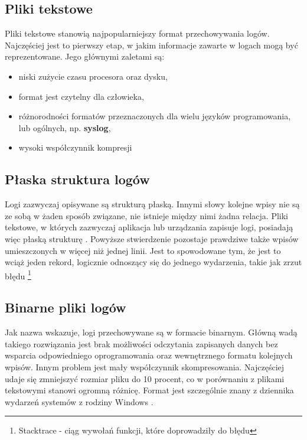     \subsection{Pliki tekstowe}
    Pliki tekstowe stanowią najpopularniejszy format przechowywania logów. Najczęściej jest to 
    pierwszy etap, w jakim informacje zawarte w logach mogą być reprezentowane. Jego głównymi zaletami są:
    \begin{itemize}
        \item niski zużycie czasu procesora oraz dysku,
        \item format jest czytelny dla człowieka,
        \item różnorodności formatów przeznaczonych dla wielu języków programowania,
        lub ogólnych, np. \textbf{syslog},
        \item wysoki współczynnik kompresji \cite{logging_log_management}
    \end{itemize}
    
    \subsection{Płaska struktura logów}
    Logi zazwyczaj opisywane są strukturą płaską. Innymi słowy kolejne wpisy nie są ze sobą w żaden sposób
    związane, nie istnieje między nimi żadna relacja. Pliki tekstowe, w których zazwyczaj aplikacja lub
    urządzania zapisuje logi, posiadają więc płaską strukturę \cite{logging_log_management}. Powyższe stwierdzenie
    pozostaje prawdziwe także wpisów umieszczonych w więcej niż jednej linii. Jest to spowodowane tym, że
    jest to wciąż jeden rekord, logicznie odnoszący się do jednego wydarzenia, takie jak zrzut błędu
    \footnote{Stacktrace - ciąg wywołań funkcji, które doprowadziły do błędu}
    
    \subsection{Binarne pliki logów}
    Jak nazwa wskazuje, logi przechowywane są w formacie binarnym. Główną wadą takiego
    rozwiązania jest brak możliwości odczytania zapisanych danych bez wsparcia odpowiedniego
    oprogramowania oraz wewnętrznego formatu kolejnych wpisów. Innym problem jest mały współczynnik
    skompresowania. Najczęściej udaje się zmniejszyć rozmiar pliku do 10 procent, co w
    porównaniu z plikami tekstowymi stanowi ogromną różnicę.
    Format jest szczególnie znany z dziennika wydarzeń systemów z rodziny Windows \cite{logging_log_management}.
    
